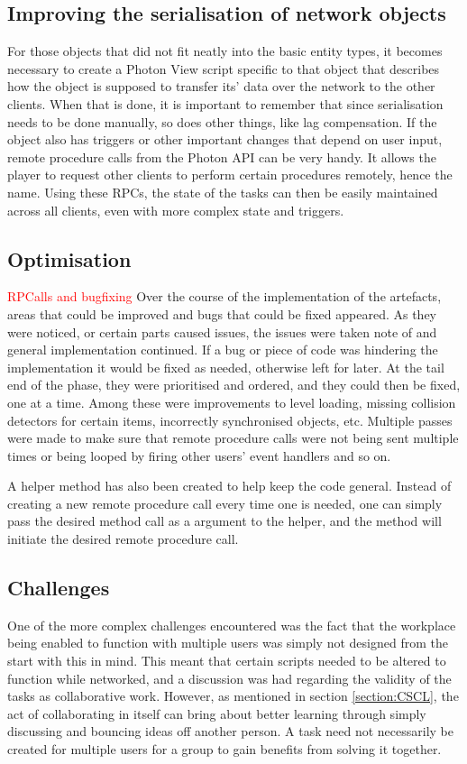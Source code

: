 \subsection{Improving the serialisation of network objects}
For those objects that did not fit neatly into the basic entity types, it becomes necessary to create a Photon View script specific to that object that describes how the object is supposed to transfer its' data over the network to the other clients. When that is done, it is important to remember that since serialisation needs to be done manually, so does other things, like lag compensation. If the object also has triggers or other important changes that depend on user input, remote procedure calls from the Photon API can be very handy. It allows the player to request other clients to perform certain procedures remotely, hence the name. Using these RPCs, the state of the tasks can then be easily maintained across all clients, even with more complex state and triggers.



\subsection{Optimisation} \label{subsec:Optimisation}
\textcolor{red}{RPCalls and bugfixing}
Over the course of the implementation of the artefacts, areas that could be improved and bugs that could be fixed appeared. As they were noticed, or certain parts caused issues, the issues were taken note of and general implementation continued. If a bug or piece of code was hindering the implementation it would be fixed as needed, otherwise left for later. At the tail end of the phase, they were prioritised and ordered, and they could then be fixed, one at a time. Among these were improvements to level loading, missing collision detectors for certain items, incorrectly synchronised objects, etc. Multiple passes were made to make sure that remote procedure calls were not being sent multiple times or being looped by firing other users' event handlers and so on. 

A helper method has also been created to help keep the code general. Instead of creating a new remote procedure call every time one is needed, one can simply pass the desired method call as a argument to the helper, and the method will initiate the desired remote procedure call. 



\subsection{Challenges}
One of the more complex challenges encountered was the fact that the workplace being enabled to function with multiple users was simply not designed from the start with this in mind. This meant that certain scripts needed to be altered to function while networked, and a discussion was had regarding the validity of the tasks as collaborative work. However, as mentioned in section \ref{section:CSCL}, the act of collaborating in itself can bring about better learning through simply discussing and bouncing ideas off another person. A task need not necessarily be created for multiple users for a group to gain benefits from solving it together.

